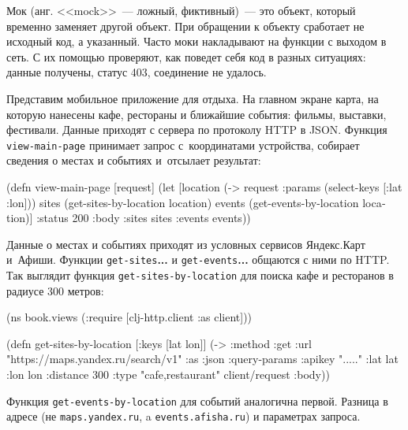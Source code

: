 
Мок (анг. <<mock>>~--- ложный, фиктивный)~--- это объект, который временно
заменяет другой объект. При обращении к объекту сработает не исходный код, а
указанный. Часто моки накладывают на функции с выходом в сеть. С их помощью
проверяют, как поведет себя код в разных ситуациях: данные получены, статус 403,
соединение не удалось.

\label{mobile-app-intro}


Представим мобильное приложение для отдыха. На главном экране карта, на которую
нанесены кафе, рестораны и ближайшие события: фильмы, выставки,
фестивали. Данные приходят с сервера по протоколу HTTP в JSON. Функция
\verb|view-main-page| принимает запрос с~координатами устройства, собирает
сведения о местах и событиях и~отсылает результат:

\begin{english}
  \begin{clojure}
(defn view-main-page [request]
  (let [location (-> request :params (select-keys [:lat :lon]))
        sites (get-sites-by-location location)
        events (get-events-by-location location)]
    {:status 200
     :body {:sites sites :events events}}))
  \end{clojure}
\end{english}

Данные о местах и событиях приходят из условных сервисов Яндекс.Карт
и~Афиши. Функции \verb|get-sites|\textbf{...} и \verb|get-events|\textbf{...}
общаются с ними по HTTP. Так выглядит функция \verb|get-sites-by-location| для
поиска кафе и ресторанов в радиусе 300 метров:


\begin{english}
  \begin{clojure}
(ns book.views
  (:require [clj-http.client :as client]))

(defn get-sites-by-location
  [{:keys [lat lon]}]
  (-> {:method :get
       :url "https://maps.yandex.ru/search/v1"
       :as :json
       :query-params {:apikey "....."
                      :lat lat :lon lon :distance 300
                      :type "cafe,restaurant"}}
      client/request
      :body))
  \end{clojure}
\end{english}

Функция \verb|get-events-by-location| для событий аналогична первой. Разница в
адресе (не \verb|maps.yandex.ru|, a \verb|events.afisha.ru|) и параметрах
запроса.


